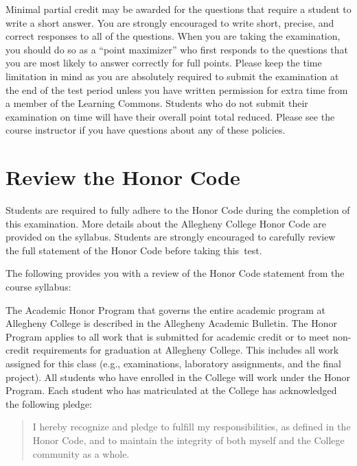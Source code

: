 \vspace*{-.05in}
\noindent Minimal partial credit may be awarded for the questions that require a student to write a short answer. You
are strongly encouraged to write short, precise, and correct responses to all of the questions. When you are taking the
examination, you should do so as a ``point maximizer'' who first responds to the questions that you are most likely to
answer correctly for full points. Please keep the time limitation in mind as you are absolutely required to submit the
examination at the end of the test period unless you have written permission for extra time from a member of the
Learning Commons. Students who do not submit their examination on time will have their overall point total reduced.
Please see the course instructor if you have questions about any of these policies.

\vspace*{-.2in}
\section*{Review the Honor Code}
\vspace*{-.1in}

\noindent Students are required to fully adhere to the Honor Code during the completion of this examination. More
details about the Allegheny College Honor Code are provided on the syllabus. Students are strongly encouraged to
carefully review the full statement of the Honor Code before taking \mbox{this test}.

\noindent The following provides you with a review of the Honor Code statement from the course syllabus:

The Academic Honor Program that governs the entire academic program at Allegheny College is described in the Allegheny
Academic Bulletin.  The Honor Program applies to all work that is submitted for academic credit or to meet non-credit
requirements for graduation at Allegheny College.  This includes all work assigned for this class (e.g., examinations,
laboratory assignments, and the final project).  All students who have enrolled in the College will work under the Honor
Program.  Each student who has matriculated at the College has acknowledged the following pledge:

\vspace*{-.11in}
\begin{quote}
  I hereby recognize and pledge to fulfill my responsibilities, as defined in the Honor Code, and to maintain the
  integrity of both myself and the College community as a whole.
\end{quote}
\vspace*{-.11in}


